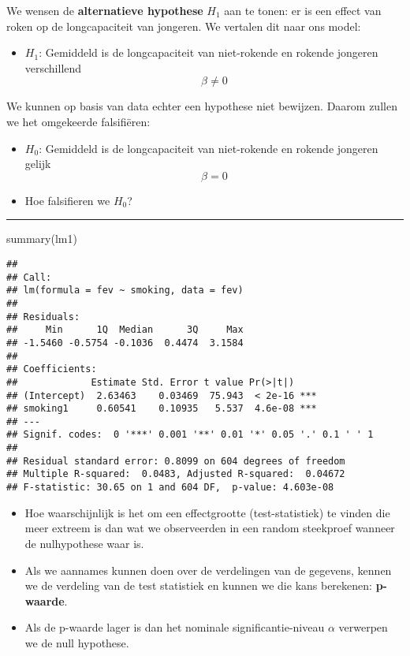 \documentclass[
]{article}
\newenvironment{Shaded}{\begin{snugshade}}{\end{snugshade}}
\newcommand{\FunctionTok}[1]{\textcolor[rgb]{0.00,0.00,0.00}{#1}}
\newcommand{\NormalTok}[1]{#1}
\providecommand{\tightlist}{%
  \setlength{\itemsep}{0pt}\setlength{\parskip}{0pt}}
\begin{document}
We wensen de \textbf{alternatieve hypothese} \(H_1\) aan te tonen: er is
een effect van roken op de longcapaciteit van jongeren. We vertalen dit
naar ons model:

\begin{itemize}
\tightlist
\item
  \(H_1\): Gemiddeld is de longcapaciteit van niet-rokende en rokende
  jongeren verschillend \[\beta \neq 0\]
\end{itemize}

We kunnen op basis van data echter een hypothese niet bewijzen. Daarom
zullen we het omgekeerde falsifiëren:

\begin{itemize}
\item
  \(H_0\): Gemiddeld is de longcapaciteit van niet-rokende en rokende
  jongeren gelijk \[\beta = 0\]
\item
  Hoe falsifieren we \(H_0\)?
\end{itemize}

\begin{center}\rule{0.5\linewidth}{0.5pt}\end{center}

\begin{Shaded}
\begin{Highlighting}[]
\FunctionTok{summary}\NormalTok{(lm1)}
\end{Highlighting}
\end{Shaded}

\begin{verbatim}
## 
## Call:
## lm(formula = fev ~ smoking, data = fev)
## 
## Residuals:
##     Min      1Q  Median      3Q     Max 
## -1.5460 -0.5754 -0.1036  0.4474  3.1584 
## 
## Coefficients:
##             Estimate Std. Error t value Pr(>|t|)    
## (Intercept)  2.63463    0.03469  75.943  < 2e-16 ***
## smoking1     0.60541    0.10935   5.537  4.6e-08 ***
## ---
## Signif. codes:  0 '***' 0.001 '**' 0.01 '*' 0.05 '.' 0.1 ' ' 1
## 
## Residual standard error: 0.8099 on 604 degrees of freedom
## Multiple R-squared:  0.0483, Adjusted R-squared:  0.04672 
## F-statistic: 30.65 on 1 and 604 DF,  p-value: 4.603e-08
\end{verbatim}

\begin{itemize}
\item
  Hoe waarschijnlijk is het om een effectgrootte (test-statistiek) te
  vinden die meer extreem is dan wat we observeerden in een random
  steekproef wanneer de nulhypothese waar is.
\item
  Als we aannames kunnen doen over de verdelingen van de gegevens,
  kennen we de verdeling van de test statistiek en kunnen we die kans
  berekenen: \textbf{p-waarde}.
\item
  Als de p-waarde lager is dan het nominale significantie-niveau
  \(\alpha\) verwerpen we de null hypothese.
\end{itemize}
\end{document}
